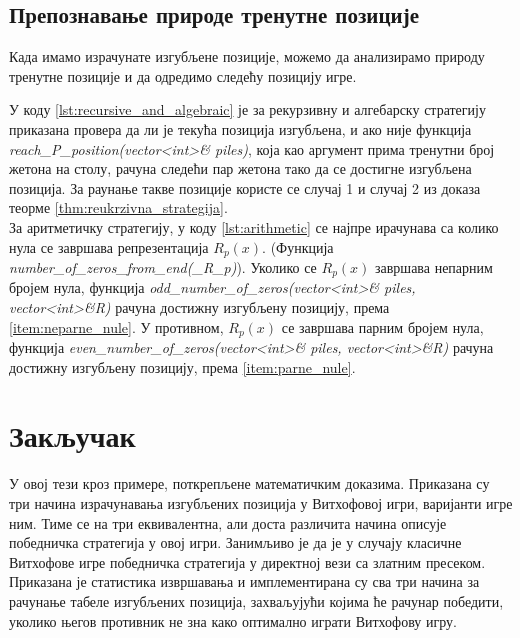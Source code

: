 \documentclass[a4paper]{article}
\begin{document}
\subsection{Препознавање природе тренутне позиције}

Када имамо израчунате изгубљене позиције, можемо да анализирамо природу тренутне позиције и да одредимо следећу позицију игре.

У коду \ref{lst:recursive_and_algebraic} је за рекурзивну и алгебарску стратегију приказана провера да ли је текућа позиција изгубљена, и ако није функција \textit{reach\_P\_position(vector<int>\& piles)}, која као аргумент прима тренутни број жетона на столу, рачуна следећи пар жетона тако да се достигне изгубљена позиција. За раунање такве позиције користе се случај 1 и случај 2 из доказа теорме \ref{thm:reukrzivna_strategija}.\\
За аритметичку стратегију, у коду \ref{lst:arithmetic} се најпре ирачунава са колико нула се завршава репрезентација $ R_{p}(x) $. (Функција \textit{number\_of\_zeros\_from\_end(\_R\_{p})}). Уколико се $ R_{p}(x) $ завршава непарним бројем нула, функција \textit{odd\_number\_of\_zeros(vector<int>\& piles, vector<int>\&R)} рачуна достижну изгубљену позицију, према \ref{item:neparne_nule}. У противном, $ R_{p}(x) $ се завршава парним бројем нула, функција \textit{even\_number\_of\_zeros(vector<int>\& piles, vector<int>\&R)} рачуна достижну изгубљену позицију, према \ref{item:parne_nule}.





\newpage

\section{Закључак}
\label{sec:zakljucak}

У овој тези кроз примере, поткрепљене математичким доказима. Приказана су три начина израчунавања изгубљених позиција у Витхофовој игри, варијанти игре ним. Тиме се на три еквивалентна, али доста различита начина описује победничка стратегија у овој игри. Занимљиво је да је у случају класичне Витхофове игре победничка стратегија у директној вези са златним пресеком. Приказана је статистика извршавања и имплементирана су сва три начина за рачунање табеле изгубљених позиција,  захваљујући којима ће рачунар победити, уколико његов противник не зна како оптимално играти Витхофову игру.
\end{document}
